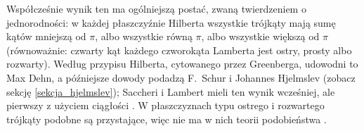 
\color{red}
Współcześnie wynik ten ma ogólniejszą postać, zwaną twierdzeniem o jednorodności: w każdej płaszczyźnie Hilberta wszystkie trójkąty mają sumę kątów mniejszą od $\pi$, albo wszystkie równą $\pi$, albo wszystkie większą od $\pi$ (równoważnie: czwarty kąt każdego czworokąta Lamberta jest ostry, prosty albo rozwarty). %
Według przypisu Hilberta, cytowanego przez Greenberga, udowodni to Max Dehn, a późniejsze dowody podadzą F.~Schur i Johannes Hjelmslev (zobacz sekcję \ref{sekcja_hjelmslev}); Saccheri i Lambert mieli ten wynik wcześniej, ale pierwszy z użyciem ciągłości \cite[s. 208]{greenberg_2010}. %
W płaszczyznach typu ostrego i rozwartego trójkąty podobne są przystające, więc nie ma w nich teorii podobieństwa \cite[s. 208]{greenberg_2010}. %
\color{black}
